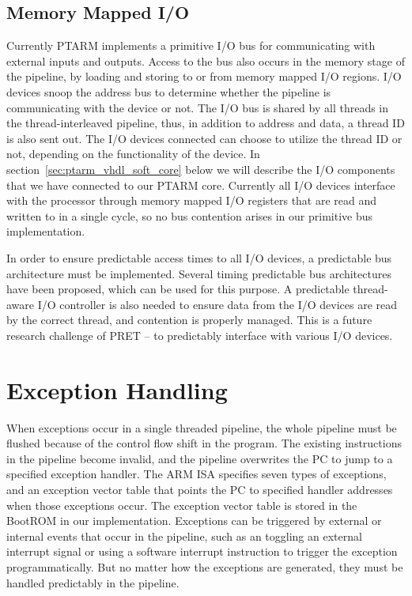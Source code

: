 \subsection{Memory Mapped I/O}
Currently PTARM implements a primitive I/O bus for communicating with external inputs and outputs.
Access to the bus also occurs in the memory stage of the pipeline, by loading and storing to or from memory mapped I/O regions.
I/O devices snoop the address bus to determine whether the pipeline is communicating with the device or not.
The I/O bus is shared by all threads in the thread-interleaved pipeline, thus, in addition to address and data, a thread ID is also sent out. 
The I/O devices connected can choose to utilize the thread ID or not, depending on the functionality of the device. 
In section~\ref{sec:ptarm_vhdl_soft_core} below we will describe the I/O components that we have connected to our PTARM core.
Currently all I/O devices interface with the processor through memory mapped I/O registers that are read and written to in a single cycle, so no bus contention arises in our primitive bus implementation.

In order to ensure predictable access times to all I/O devices, a predictable bus architecture must be implemented.   
Several timing predictable bus architectures~ have been proposed, which can be used for this purpose. 
A predictable thread-aware I/O controller is also needed to ensure data from the I/O devices are read by the correct thread, and contention is properly managed.  
This is a future research challenge of PRET -- to predictably interface with various I/O devices.    

\section{Exception Handling}
\label{subsec:exception_handling_in_ptarm}
When exceptions occur in a single threaded pipeline, the whole pipeline must be flushed because of the control flow shift in the program. 
The existing instructions in the pipeline become invalid, and the pipeline overwrites the PC to jump to a specified exception handler. 
The ARM ISA specifies seven types of exceptions, and an exception vector table that points the PC to specified handler addresses when those exceptions occur. 
The exception vector table is stored in the BootROM in our implementation.
Exceptions can be triggered by external or internal events that occur in the pipeline, such as an toggling an external interrupt signal or using a software interrupt instruction to trigger the exception programmatically.
But no matter how the exceptions are generated, they must be handled predictably in the pipeline.
 
